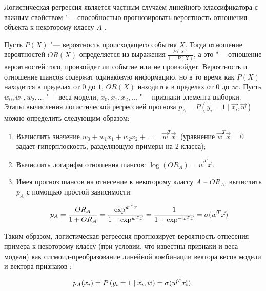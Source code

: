 \documentclass[bachelor, och, coursework]{SCWorks}
\begin{document}
            Логистическая регрессия является частным случаем линейного
            классификатора с важным свойством "--- способностью прогнозировать
            вероятность отношения объекта к некоторому классу $A$ \cite{logreg}.

            Пусть $P(X)$ "--- вероятность происходящего события $X$. Тогда
            отношение вероятностей $OR(X)$ определяется из выражения
            $\frac{P(X)}{1 - P(X)}$, а это "--- отношение вероятностей того,
            произойдет ли событие или не произойдет. Вероятность и отношение
            шансов содержат одинаковую информацию, но в то время как $P(X)$
            находится в пределах от $0$ до $1$, $OR(X)$ находится в пределах от
            $0$ до $\infty$. Пусть $w_0, w_1, w_2, \dots$ "--- веса модели,
            $x_0, x_1, x_2, \dots$ "--- признаки элемента выборки. Этапы
            вычисления логистической регрессией прогноза $p_A = P\left(y_i = 1
            \mid \vec{x_i}, \vec{w}\right)$ можно определить следующим образом:

            \begin{enumerate}
                \item Вычислить значение $w_{0}+w_{1}x_1 + w_{2}x_2 + ... =
                \vec{w}^T\vec{x}$. (уравнение $\vec{w}^T\vec{x} = 0$ задает
                гиперплоскость, разделяющую примеры на 2 класса);
                \item Вычислить логарифм отношения шансов: $ \log(OR_{A}) =
                \vec{w}^T\vec{x}$.
                \item Имея прогноз шансов на отнесение к некоторому классу $A$ –
                $OR_{A}$, вычислить $p_{A}$ с помощью простой зависимости:

                $$\large p_{A} = \frac{OR_{A}}{1 + OR_{A}} =
                \frac{\exp^{\vec{w}^T\vec{x}}}{1 + \exp^{\vec{w}^T\vec{x}}} =
                \frac{1}{1 + \exp^{-\vec{w}^T\vec{x}}} =
                \sigma(\vec{w}^T\vec{x})$$
            \end{enumerate}

            Таким образом, логистическая регрессия прогнозирует вероятность
            отнесения примера к некоторому классу (при условии, что известны
            признаки и веса модели) как сигмоид-преобразование линейной
            комбинации вектора весов модели и вектора признаков \cite{logreg2}:

            $$\large p_A(x_i) = P\left(y_i = 1 \mid \vec{x_i}, \vec{w}\right) =
            \sigma(\vec{w}^T\vec{x_i}). $$
\end{document}
